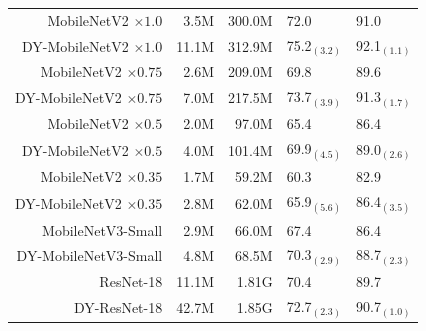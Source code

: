 \documentclass[10pt,twocolumn,letterpaper]{article}
\begin{document}
\begin{table}[t!]
\begin{center}
\begin{tabular}{r|r|r|ll}
			\specialrule{.1em}{.05em}{.05em} 
			MobileNetV2 $\times1.0$  & 3.5M & 300.0M & 72.0  & 91.0  \\
			DY-MobileNetV2 $\times1.0$ & 11.1M & 312.9M & 75.2$_{(3.2)}$ & 92.1$_{(1.1)}$	  \\
			 \hline
			MobileNetV2 $\times0.75$  & 2.6M & 209.0M & 69.8 & 89.6 		 \\
			DY-MobileNetV2 $\times0.75$ & 7.0M & 217.5M  & 73.7$_{(3.9)}$ & 91.3$_{(1.7)}$		 \\
			\hline
			MobileNetV2 $\times0.5$  & 2.0M & 97.0M & 65.4 & 86.4 		 \\
			DY-MobileNetV2 $\times0.5$ & 4.0M & 101.4M & 69.9$_{(4.5)}$ & 89.0$_{(2.6)}$		 \\
			\hline
			MobileNetV2 $\times0.35$ & 1.7M & 59.2M  & {60.3}& {82.9} 		 \\
			DY-MobileNetV2 $\times0.35$& 2.8M & 62.0M & 65.9$_{(5.6)}$ & 86.4$_{(3.5)}$ 		 \\
			\hline
			MobileNetV3-Small  & 2.9M & 66.0M & 67.4 & 86.4   \\
			DY-MobileNetV3-Small  & 4.8M & 68.5M & 70.3$_{(2.9)}$ & 88.7$_{(2.3)}$	 		 \\
			\hline
			ResNet-18  & 11.1M & 1.81G & 70.4  & 89.7  \\
			DY-ResNet-18 & 42.7M & 1.85G & 72.7$_{(2.3)}$ & 90.7$_{(1.0)}$	  \\

\end{tabular}
\end{center}
\end{table}
\end{document}
